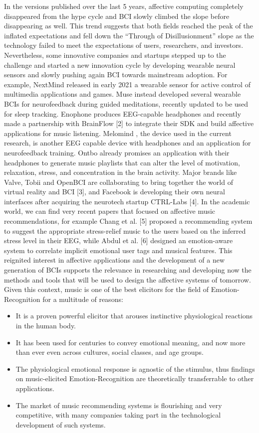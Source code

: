 In the versions published over the last 5 years, affective computing completely disappeared from the hype cycle and BCI slowly climbed the slope before disappearing as well. This trend suggests that both fields reached the peak of the inflated expectations and fell down the “Through of Disillusionment” slope as the technology failed to meet the expectations of users, researchers, and investors. Nevertheless, some innovative companies and startups stepped up to the challenge and started a new innovation cycle by developing wearable neural sensors and slowly pushing again BCI towards mainstream adoption. For example, NextMind  released in early 2021 a wearable sensor for active control of multimedia applications and games. Muse  instead developed several wearable BCIs for neurofeedback during guided meditations, recently updated to be used for sleep tracking. Enophone produces EEG-capable headphones and recently made a partnership with BrainFlow [2] to integrate their SDK and build affective applications for music listening. Melomind , the device used in the current research, is another EEG capable device with headphones and an application for neurofeedback training. Ontbo  already promises an application with their headphones to generate music playlists that can alter the level of motivation, relaxation, stress, and concentration in the brain activity. Major brands like Valve, Tobii and OpenBCI are collaborating to bring together the world of virtual reality and BCI [3], and Facebook is developing their own neural interfaces after acquiring the neurotech startup CTRL-Labs [4]. In the academic world, we can find very recent papers that focused on affective music recommendations, for example Chang et al. [5] proposed a recommending system to suggest the appropriate stress-relief music to the users based on the inferred stress level in their EEG, while Abdul et al. [6] designed an emotion-aware system to correlate implicit emotional user tags and musical features. This reignited interest in affective applications and the development of a new generation of BCIs supports the relevance in researching and developing now the methods and tools that will be used to design the affective systems of tomorrow. Given this context, music is one of the best elicitors for the field of Emotion-Recognition for a multitude of reasons: 
\begin{itemize}
\item It is a proven powerful elicitor that arouses instinctive physiological reactions in the human body.
\item It has been used for centuries to convey emotional meaning, and now more than ever even across cultures, social classes, and age groups.
\item The physiological emotional response is agnostic of the stimulus, thus findings on music-elicited Emotion-Recognition are theoretically transferrable to other applications.
\item The market of music recommending systems is flourishing and very competitive, with many companies taking part in the technological development of such systems.
\end{itemize}
